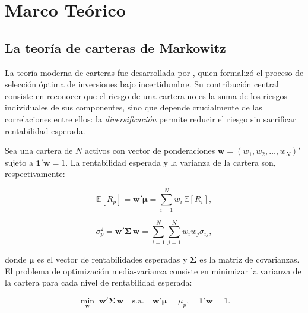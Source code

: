 \documentclass[12pt, a4paper]{article}
\begin{document}
\section{Marco Te\'orico}
\label{sec:marco}

\subsection{La teor\'ia de carteras de Markowitz}
\label{subsec:markowitz}

La teor\'ia moderna de carteras fue desarrollada por \textcite{markowitz1952},
quien formaliz\'o el proceso de selecci\'on \'optima de inversiones bajo
incertidumbre. Su contribuci\'on central consiste en reconocer que el riesgo de
una cartera no es la suma de los riesgos individuales de sus componentes, sino que
depende crucialmente de las correlaciones entre ellos: la \textit{diversificaci\'on}
permite reducir el riesgo sin sacrificar rentabilidad esperada.

Sea una cartera de $N$ activos con vector de ponderaciones
$\mathbf{w} = (w_1, w_2, \ldots, w_N)'$ sujeto a $\mathbf{1}'\mathbf{w} = 1$.
La rentabilidad esperada y la varianza de la cartera son, respectivamente:

\begin{equation}
  \label{eq:markowitz_r}
  \mathbb{E}[R_p] = \mathbf{w}'\boldsymbol{\mu} = \sum_{i=1}^{N} w_i\,\mathbb{E}[R_i],
\end{equation}

\begin{equation}
  \label{eq:markowitz_var}
  \sigma_p^2 = \mathbf{w}'\boldsymbol{\Sigma}\,\mathbf{w}
    = \sum_{i=1}^{N}\sum_{j=1}^{N} w_i w_j \sigma_{ij},
\end{equation}

donde $\boldsymbol{\mu}$ es el vector de rentabilidades esperadas y
$\boldsymbol{\Sigma}$ es la matriz de covarianzas. El problema de optimizaci\'on
media-varianza consiste en minimizar la varianza de la cartera para cada nivel
de rentabilidad esperada:

\begin{equation}
  \label{eq:markowitz_opt}
  \min_{\mathbf{w}} \; \mathbf{w}'\boldsymbol{\Sigma}\,\mathbf{w}
  \quad \text{s.a.} \quad
  \mathbf{w}'\boldsymbol{\mu} = \mu_p, \quad \mathbf{1}'\mathbf{w} = 1.
\end{equation}
\end{document}
